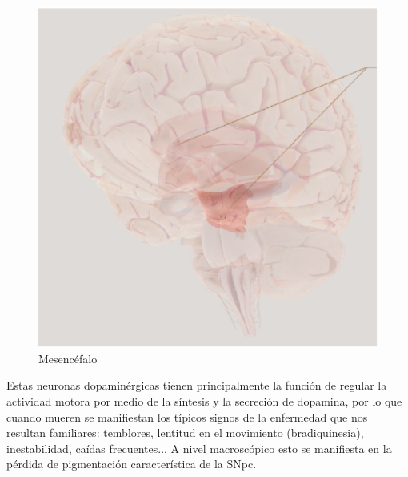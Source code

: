 \begin{figure}[H]
\begin{minipage}[b]{0.5\linewidth}
		\includegraphics[width=\linewidth]{mesenc.png}
		\caption{Mesencéfalo}
		\label{fig:mesenc}
	\end{minipage}
\end{figure}



Estas neuronas dopaminérgicas tienen principalmente la función de regular la actividad motora por medio de la síntesis y la secreción de dopamina, por lo que cuando mueren se manifiestan los típicos signos de la enfermedad que nos resultan familiares: temblores, lentitud en el movimiento (bradiquinesia), inestabilidad, caídas frecuentes... A nivel macroscópico esto se manifiesta en la pérdida de pigmentación característica de la SNpc.

